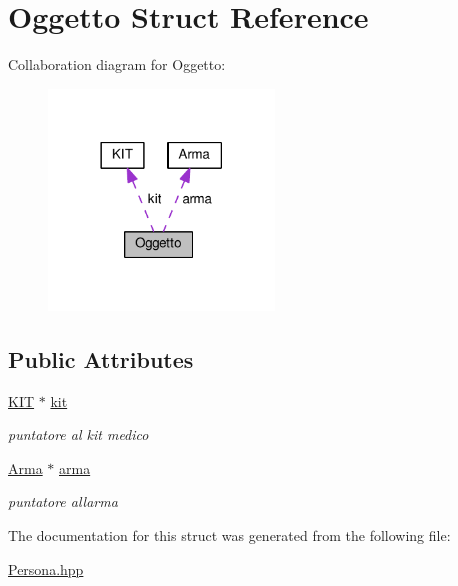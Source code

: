 \hypertarget{structOggetto}{}\section{Oggetto Struct Reference}
\label{structOggetto}


Collaboration diagram for Oggetto\+:\nopagebreak
\begin{figure}[H]
\begin{center}
\leavevmode
\includegraphics[width=170pt]{structOggetto__coll__graph}
\end{center}
\end{figure}
\subsection*{Public Attributes}
\begin{DoxyCompactItemize}
\item 
\hypertarget{structOggetto_ae58234e8df0dad2e0ab520d5b26224de}{}\hyperlink{structKIT}{K\+I\+T} $\ast$ \hyperlink{structOggetto_ae58234e8df0dad2e0ab520d5b26224de}{kit}\label{structOggetto_ae58234e8df0dad2e0ab520d5b26224de}

\begin{DoxyCompactList}\small\item\em puntatore al kit medico \end{DoxyCompactList}\item 
\hypertarget{structOggetto_af0c4461aacfaa7c0b41ae693cfae193f}{}\hyperlink{classArma}{Arma} $\ast$ \hyperlink{structOggetto_af0c4461aacfaa7c0b41ae693cfae193f}{arma}\label{structOggetto_af0c4461aacfaa7c0b41ae693cfae193f}

\begin{DoxyCompactList}\small\item\em puntatore all\textquotesingle{}arma \end{DoxyCompactList}\end{DoxyCompactItemize}


The documentation for this struct was generated from the following file\+:\begin{DoxyCompactItemize}
\item 
\hyperlink{Persona_8hpp}{Persona.\+hpp}\end{DoxyCompactItemize}
